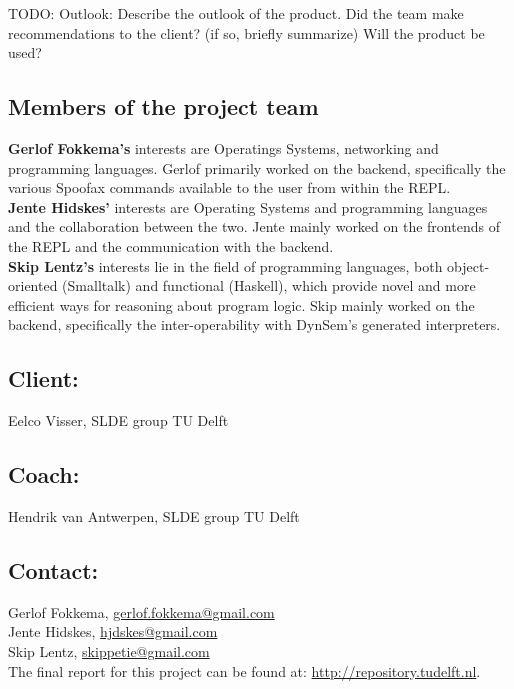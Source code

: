 TODO: Outlook: Describe the outlook of the product. Did the team make recommendations to the 
client? (if so, briefly summarize) Will the product be used?

\subsection*{Members of the project team}
\textbf{Gerlof Fokkema's} interests are Operatings Systems, networking and
programming languages. Gerlof primarily worked on the backend, specifically the
various Spoofax commands available to the user from within the REPL.\\
\textbf{Jente Hidskes'} interests are Operating Systems and programming
languages and the collaboration between the two. Jente mainly worked
on the frontends of the REPL and the communication with the backend.\\
\textbf{Skip Lentz's} interests lie in the field of programming languages,
both object-oriented (Smalltalk) and functional (Haskell), which provide
novel and more efficient ways for reasoning about program logic. Skip mainly
worked on the backend, specifically the inter-operability with DynSem's
generated interpreters.

\subsection*{Client:}
Eelco Visser, SLDE group TU Delft

\subsection*{Coach:}
Hendrik van Antwerpen, SLDE group TU Delft

\subsection*{Contact:}
Gerlof Fokkema, \href{mailto:gerlof.fokkema@gmail.com}{gerlof.fokkema@gmail.com}\\
Jente Hidskes, \href{mailto:hjdskes@gmail.com}{hjdskes@gmail.com}\\
Skip Lentz, \href{mailto:skippetie@gmail.com}{skippetie@gmail.com}\\

\noindent The final report for this project can be found at: \url{http://repository.tudelft.nl}.

